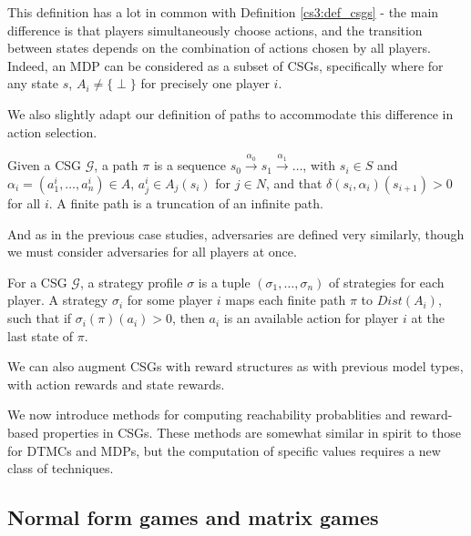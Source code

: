 This definition has a lot in common with Definition \ref{cs3:def_csgs} - the main difference is that players simultaneously choose actions, and the transition between states depends on the combination of actions chosen by all players. Indeed, an MDP can be considered as a subset of CSGs, specifically where for any state $s$, $A_i \neq \{ \perp \} $ for precisely one player $i$.

We also slightly adapt our definition of paths to accommodate this difference in action selection.

\begin{definition}
    \label{cs3:csgs_paths}

    Given a CSG $\mathcal{G}$, a path $\pi$ is a sequence $s_0 \xrightarrow{\alpha_0} s_1 \xrightarrow{\alpha_1} \dots$, with $s_i \in S$ and $\alpha_i = (a^{i}_1, \dots, a^{i}_n) \in A$, $a^{i}_j \in A_{j}(s_i)$ for $j \in N$, and that $\delta(s_i, \alpha_i )(s_{i+1}) > 0$ for all $i$. A finite path is a truncation of an infinite path.
\end{definition}

And as in the previous case studies, adversaries are defined very similarly, though we must consider adversaries for all players at once.

\begin{definition}
    \label{cs3:csgs_strats}

    For a CSG $\mathcal{G}$, a strategy profile $\sigma$ is a tuple $(\sigma_1, \dots, \sigma_n)$ of strategies for each player. A strategy $\sigma_i$ for some player $i$ maps each finite path $\pi$ to $Dist(A_i)$, such that if $\sigma_i(\pi)(a_i) > 0$, then $a_i$ is an available action for player $i$ at the last state of $\pi$.

\end{definition}

We can also augment CSGs with reward structures as with previous model types, with action rewards and state rewards.

We now introduce methods for computing reachability probablities and reward-based properties in CSGs. These methods are somewhat similar in spirit to those for DTMCs and MDPs, but the computation of specific values requires a new class of techniques.

\subsection{Normal form games and matrix games}
\label{cs3:prop_ver_csgs}

